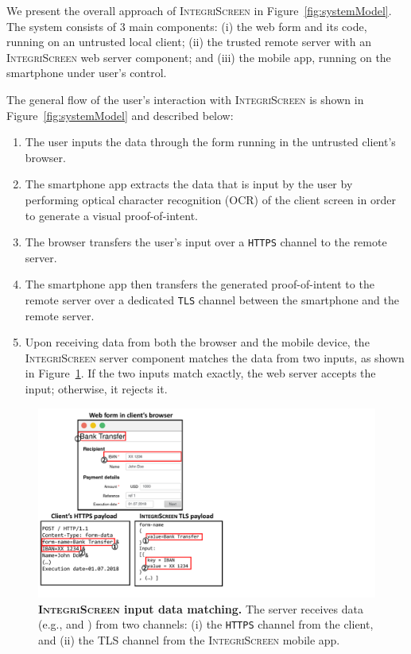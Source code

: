 \documentclass[sigconf, anonymous, balance=false]{acmart}
\let\oldding\ding%
\renewcommand{\ding}[2][1]{\scalebox{#1}{\oldding{#2}}}%
\newcommand{\one}{\ding[1.2]{172}\xspace}
\newcommand{\two}{\ding[1.2]{173}\xspace}
\newcommand{\three}{\ding[1.2]{174}\xspace}
\newcommand{\four}{\ding[1.2]{175}\xspace}
\newcommand{\five}{\ding[1.2]{176}\xspace}
\newcommand{\app}{smartphone app\xspace}
\newcommand{\server}{server\xspace}
\newcommand{\https}{\texttt{HTTPS}\xspace}
\newcommand{\tls}{\texttt{TLS}\xspace}
\newcommand{\POI}{proof-of-intent\xspace}
\newcommand{\sysname}{\textsc{IntegriScreen}\xspace}
\newcommand{\name}{\sysname}
\begin{document}
We present the overall approach of \sysname in Figure~\ref{fig:systemModel}.
The system consists of 3 main components: (i) the web form and its code, running on an untrusted local client; (ii) the trusted remote \server with an \name web server component; and (iii) the mobile app, running on the smartphone under user's control.

The general flow of the user's interaction with \sysname is shown in Figure~\ref{fig:systemModel} and described below:
\begin{enumerate} %
  \item[\one] The user inputs the data through the form running in the untrusted client's browser.

  \item[\two] The \app extracts the data that is input by the user by performing optical character recognition (OCR) of the client screen in order to generate a visual \POI.

  \item[\three] The browser transfers the user's input over a \https channel to the remote server.

  \item[\four] The \app then transfers the generated \POI to the remote server over a dedicated \tls channel between the smartphone and the remote server.

  \item[\five] Upon receiving data from both the browser and the mobile device, the \name server component matches the data from two inputs, as shown in Figure~\ref{fig:traceMatching}.
  If the two inputs match exactly, the web server accepts the input; otherwise, it rejects it.
\end{enumerate}



\begin{figure}[t]
    \centering
    \includegraphics[trim={0 1cm 15cm 0},clip,width=0.9\linewidth]{img/inputMatching.pdf}
\caption{\textbf{\name input data matching.}
        The server receives data (e.g., \one and \two) from two channels: (i) the \https channel from the client, and (ii) the TLS channel from the \name mobile app.}
    \label{fig:traceMatching}
    \vspace{0.3cm}
\end{figure}
\end{document}
